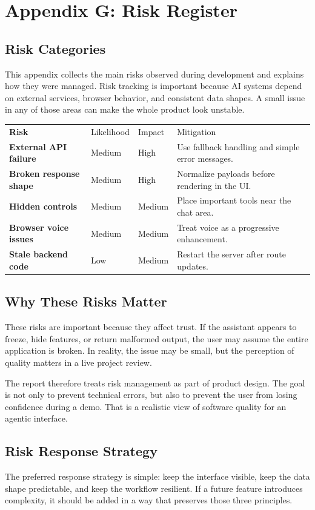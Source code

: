\documentclass[11pt,oneside]{report}
\begin{document}
\chapter{Appendix G: Risk Register}
\section{Risk Categories}
This appendix collects the main risks observed during development and explains how they were managed. Risk tracking is important because AI systems depend on external services, browser behavior, and consistent data shapes. A small issue in any of those areas can make the whole product look unstable.

\begin{tabularx}{\textwidth}{>{\bfseries}p{}p{}p{}X}
Risk & Likelihood & Impact & Mitigation \\
External API failure & Medium & High & Use fallback handling and simple error messages. \\
Broken response shape & Medium & High & Normalize payloads before rendering in the UI. \\
Hidden controls & Medium & Medium & Place important tools near the chat area. \\
Browser voice issues & Medium & Medium & Treat voice as a progressive enhancement. \\
Stale backend code & Low & Medium & Restart the server after route updates. \\
\end{tabularx}

\section{Why These Risks Matter}
These risks are important because they affect trust. If the assistant appears to freeze, hide features, or return malformed output, the user may assume the entire application is broken. In reality, the issue may be small, but the perception of quality matters in a live project review.

The report therefore treats risk management as part of product design. The goal is not only to prevent technical errors, but also to prevent the user from losing confidence during a demo. That is a realistic view of software quality for an agentic interface.

\section{Risk Response Strategy}
The preferred response strategy is simple: keep the interface visible, keep the data shape predictable, and keep the workflow resilient. If a future feature introduces complexity, it should be added in a way that preserves those three principles.
\end{document}
